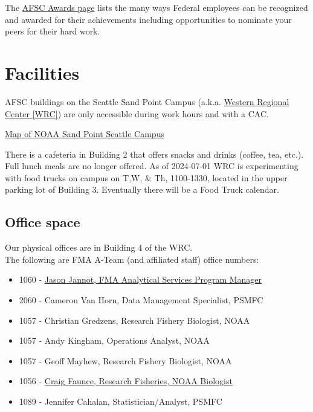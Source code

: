 \documentclass[
  letterpaper,
  DIV=11,
  numbers=noendperiod]{scrreprt}
\providecommand{\tightlist}{%
  \setlength{\itemsep}{0pt}\setlength{\parskip}{0pt}}\usepackage{longtable,booktabs,array}
\begin{document}
The
\href{https://sites.google.com/noaa.gov/myafsc/administrative/workforce-management/awards}{AFSC
Awards page} lists the many ways Federal employees can be recognized and
awarded for their achievements including opportunities to nominate your
peers for their hard work.

\section{Facilities}\label{facilities}

AFSC buildings on the Seattle Sand Point Campus (a.k.a.
\href{https://www.wrc.noaa.gov/}{Western Regional Center {[}WRC{]}}) are
only accessible during work hours and with a CAC.

\href{https://www.wrc.noaa.gov/images/WRC_Map.jpg}{Map of NOAA Sand
Point Seattle Campus}

There is a cafeteria in Building 2 that offers snacks and drinks
(coffee, tea, etc.). Full lunch meals are no longer offered. As of
2024-07-01 WRC is experimenting with food trucks on campus on T,W, \&
Th, 1100-1330, located in the upper parking lot of Building 3.
Eventually there will be a Food Truck calendar.

\subsection{Office space}\label{office-space}

Our physical offices are in Building 4 of the WRC.\\
The following are FMA A-Team (and affiliated staff) office numbers:

\begin{itemize}
\tightlist
\item
  1060 -
  \href{https://www.fisheries.noaa.gov/contact/jason-e-jannot}{Jason
  Jannot, FMA Analytical Services Program Manager}
\item
  2060 - Cameron Van Horn, Data Management Specialist, PSMFC
\item
  1057 - Christian Gredzens, Research Fishery Biologist, NOAA
\item
  1057 - Andy Kingham, Operations Analyst, NOAA
\item
  1057 - Geoff Mayhew, Research Fishery Biologist, NOAA
\item
  1056 -
  \href{https://www.fisheries.noaa.gov/contact/craig-h-faunce}{Craig
  Faunce, Research Fisheries, NOAA Biologist}
\item
  1089 - Jennifer Cahalan, Statistician/Analyst, PSMFC
\end{itemize}
\end{document}
